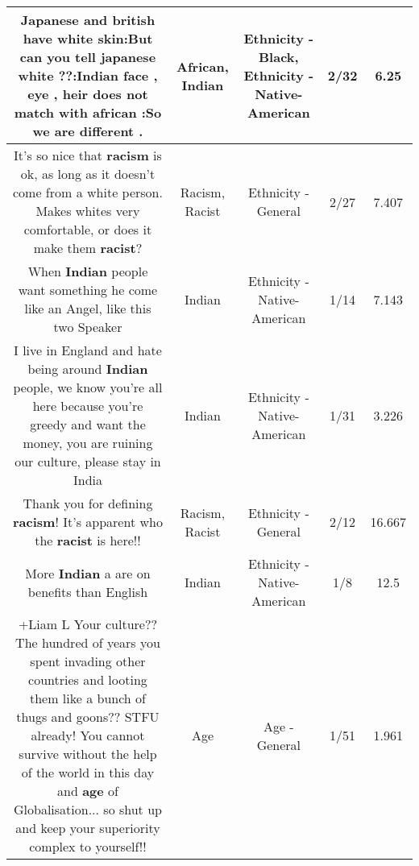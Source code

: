 \documentclass[11pt]{article}
\newlength\mylength
\begin{document}
\begin{center}
\begin{longtable}{|C{.65\mylength}|C{.30\mylength}|C{.12\mylength}|C{.12\mylength}|C{.12\mylength}|}
  \small Japanese and british have white skin:But can you tell japanese white ??:\textbf{Indian} face , eye , heir does not match with \textbf{african} :So we are different .\normalsize   & African, Indian & Ethnicity - Black, Ethnicity - Native-American & 2/32 & 6.25 \\  \hline
  \small It's so nice that \textbf{racism} is ok, as long as it doesn't come from a white person. Makes whites very comfortable, or does it make them \textbf{racist}?\normalsize   & Racism, Racist & Ethnicity - General & 2/27 & 7.407 \\  \hline
  \small When \textbf{Indian} people want something he come like an Angel, like this two Speaker\normalsize   & Indian & Ethnicity - Native-American & 1/14 & 7.143 \\  \hline
  \small I live in England and hate being around \textbf{Indian} people, we know you're all here because you're greedy and want the money, you are ruining our culture, please stay in India\normalsize   & Indian & Ethnicity - Native-American & 1/31 & 3.226 \\  \hline
  \small Thank you for defining \textbf{racism}! It's apparent who the \textbf{racist} is here!!\normalsize   & Racism, Racist & Ethnicity - General & 2/12 & 16.667 \\  \hline
  \small More \textbf{Indian} a are on benefits than English\normalsize   & Indian & Ethnicity - Native-American & 1/8 & 12.5 \\  \hline
  \small +Liam L Your culture?? The hundred of years you spent invading other countries and looting them like a bunch of thugs and goons?? STFU already! You cannot survive without the help of the world in this day and \textbf{age} of Globalisation... so shut up and keep your superiority complex to yourself!!\normalsize   & Age & Age - General & 1/51 & 1.961 \\  \hline

\end{longtable}
\end{center}
\end{document}

